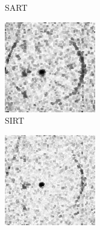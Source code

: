 \documentclass[journal]{IEEEtran}
\begin{document}
\begin{figure}[!h]
\begin{subfigure}[b]{0.24\linewidth}
        \caption{SART}
     \end{subfigure}
    \begin{subfigure}[b]{0.24\linewidth}
        \includegraphics[width=\textwidth]{../images/potato/2D/weightsIm_sirt30.png}
        \caption{SIRT}
     \end{subfigure}
    \begin{subfigure}[b]{0.24\linewidth}
        \includegraphics[width=\textwidth]{../images/potato/2D/weightsIm_all_methods30.png}

\end{subfigure}
\end{figure}
\end{document}
